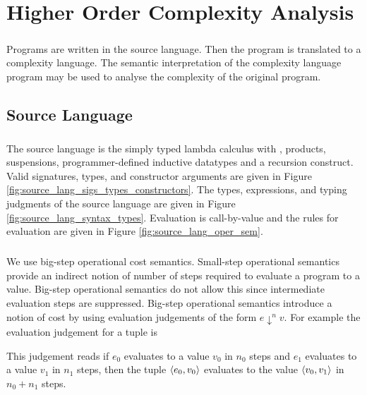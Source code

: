 \chapter{Higher Order Complexity Analysis}
\paragraph{}
Programs are written in the source language. Then the program is translated
to a complexity language. The semantic interpretation of the complexity
language program may be used to analyse the complexity of the original
program.

\section{Source Language}
\paragraph{}
The source language is the simply typed lambda calculus with ,
products, suspensions, programmer-defined inductive datatypes and a recursion
construct. Valid signatures, types, and constructor arguments are given in
Figure \ref{fig:source_lang_sigs_types_constructors}. The types, expressions,
and typing judgments of the source language are given in Figure
\ref{fig:source_lang_syntax_types}. Evaluation is call-by-value and the rules
for evaluation are given in Figure \ref{fig:source_lang_oper_sem}.

\paragraph{}
We use big-step operational cost semantics. Small-step operational semantics
provide an indirect notion of number of steps required to evaluate a program to
a value. Big-step operational semantics do not allow this since intermediate
evaluation steps are suppressed. Big-step operational semantics introduce a
notion of cost by using evaluation judgements of the form $e \downarrow^n v$.
For example the evaluation judgement for a tuple is
%
\begin{prooftree}
\end{prooftree}
%
This judgement reads if $e_0$ evaluates to a value $v_0$ in $n_0$ steps and
$e_1$ evaluates to a value $v_1$ in $n_1$ steps, then the tuple $\LP
e_0,v_0\RP$ evaluates to the value $\LP v_0,v_1\RP$ in $n_0+n_1$ steps.

